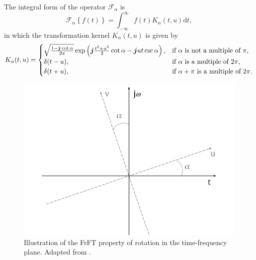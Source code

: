 The integral form of the operator $\mathcal{F}_\alpha$ is
\begin{equation}
\label{eq:integralfrft}
\mathcal{F}_\alpha \left\{ f(t) \right\} = \int_{-\infty}^{\infty} f(t) K_\alpha (t, u) \mathrm{d}t,
\end{equation}
in which the transformation kernel $K_\alpha (t, u)$ is given by
\begin{equation}
K_\alpha (t, u) = 
\begin{cases}
\sqrt{\frac{1 - \boldsymbol{j} \cot \alpha}{2\pi}} \exp \left( \boldsymbol{j} \frac{t^2 + u^2}{2} \cot \alpha - \boldsymbol{j} ut \csc \alpha\right), &
\text{if $\alpha$ is not a multiple of $\pi$,} \\
\delta (t - u), & \text{if $\alpha$ is a multiple of $2\pi$,} \\
\delta (t + u), & \text{if $\alpha + \pi$ is a multiple of $2\pi$.}
\end{cases}
\end{equation}

\begin{figure}
\centering
\includegraphics[width=0.65\linewidth]{Figures/FrFT-Rotation-cropped.pdf}
\caption{Illustration of the FrFT property of rotation in the time-frequency plane. Adapted from \cite{almeida1994fractional}.}
\label{fig:frft_rotation}
\end{figure}

